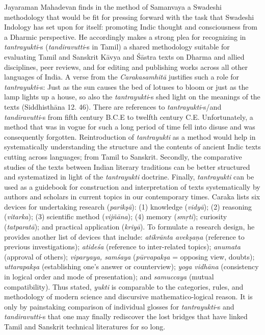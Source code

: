 Jayaraman Mahadevan finds in the method of Samanvaya a Swadeshi methodology that would be fit for pressing forward with the task that Swadeshi Indology has set upon for itself: promoting Indic thought and consciousness from a Dharmic perspective. He accordingly makes a strong plea for recognizing in \textit{tantrayukti}-s (\textit{tandiravutti}-s in Tamil) a shared methodology suitable for evaluating Tamil and Sanskrit Kāvya and Śāstra texts on Dharma and allied disciplines, peer reviews, and for editing and publishing works across all other languages of India. A verse from the \textit{Carakasamhitā} justifies such a role for \textit{tantrayukti}-s: Just as the sun causes the bed of lotuses to bloom or just as the lamp lights up a house, so also the \textit{tantrayukti}-s shed light on the meanings of the texts (Siddhisthāna 12. 46). There are references to \textit{tantrayukti}-s/and \textit{tandiravutti}-s from fifth century B.C.E to twelfth century C.E. Unfortunately, a method that was in vogue for such a long period of time fell into disuse and was consequently forgotten. Reintroduction of \textit{tantrayukti} as a method would help in systematically understanding the structure and the contents of ancient Indic texts cutting across languages; from Tamil to Sanskrit. Secondly, the comparative studies of the texts between Indian literary traditions can be better structured and systematized in light of the \textit{tantrayukti} doctrine. Finally, \textit{tantrayukti} can be used as a guidebook for construction and interpretation of texts systematically by authors and scholars in current topics in our contemporary times. Caraka lists six devices for undertaking research (\textit{parikşā}): (1) knowledge (\textit{vidyā}); (2) reasoning (\textit{vitarka}); (3) scientific method (\textit{vijñāna}); (4) memory (\textit{smŗti}); curiosity (\textit{tatparatā}); and practical application (\textit{kriyā}). To formulate a research design, he provides another list of devices that include: \textit{atikrānta avekşaņa} (reference to previous investigations); \textit{atideśa} (reference to inter-related topics); \textit{anumata} (approval of others); \textit{viparyaya, samśaya} (\textit{pūrvapakşa} = opposing view, doubts); \textit{uttarapakşa} (establishing one’s answer or counterview); \textit{yoga vidhāna} (consistency in logical order and mode of presentation); and \textit{samuccaya} (mutual compatibility). Thus stated, \textit{yukti} is comparable to the categories, rules, and methodology of modern science and discursive mathematico-logical reason. It is only by painstaking comparison of individual glosses for \textit{tantrayukti}-s and \textit{tandiravutti}-s that one may finally rediscover the lost bridges that have linked Tamil and Sanskrit technical literatures for so long.

